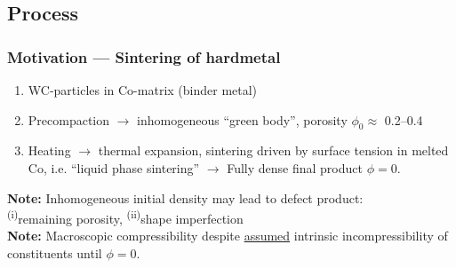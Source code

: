 \documentclass[11pt]{beamer} %
\renewcommand{\alert}[1]{\textbf{#1}}
\begin{document}
\subsection{Process}
\begin{frame}
 \frametitle{Motivation --- Sintering of hardmetal}


 \begin{enumerate}
  \item WC-particles in Co-matrix (binder metal)
  \item Precompaction $\rightarrow$ inhomogeneous ``green body'', porosity $\phi_0\approx$ 0.2--0.4
  \item Heating $\rightarrow$ thermal expansion, sintering driven by surface tension in melted Co, i.e. ``liquid phase sintering'' $\rightarrow$
        Fully dense final product $\phi=0$.
 \end{enumerate}
\alert{Note:} Inhomogeneous initial density may lead to defect product:\\ \textsuperscript{(i)}remaining porosity, \textsuperscript{(ii)}shape imperfection\\
\alert{Note:} Macroscopic compressibility despite \underline{assumed} intrinsic incompressibility of constituents until $\phi = 0$.
\begin{center}
 \begin{columns}
 \centering
\end{columns}
\end{center}
\end{frame}
\end{document}

